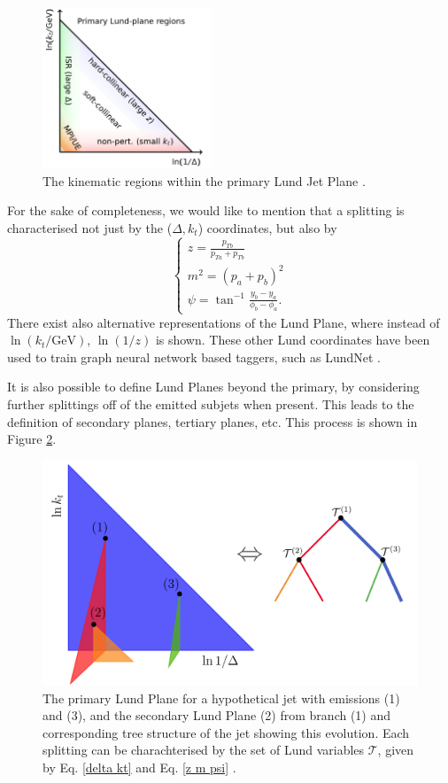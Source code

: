 \documentclass[10pt,a4paper]{book}
\begin{document}
\begin{figure}[]
\centering
\includegraphics[width=0.45\textwidth]{lund_plane}
\caption{The kinematic regions within the primary Lund Jet Plane \cite{Dreyer:2018nbf}.}
\label{LundPlane}
\end{figure}

For the sake of completeness, we would like to mention that a splitting is characterised not just by the ($\Delta, k_t$) coordinates, but also by
\begin{equation}
\begin{cases}
 z = \frac{p_{Tb}}{p_{Ta}+p_{Tb}} \\
 m^2 = (p_a + p_b)^2 \\
 \psi = \tan^{-1} \frac{y_b - y_a}{\phi_b - \phi_a}.
\end{cases}
\label{z m psi}
\end{equation}
There exist also alternative representations of the Lund Plane, where instead of $\ln(k_t/\mathrm{GeV})$, $\ln(1/z)$ is shown. These other Lund coordinates have been used to train graph neural network based taggers, such as LundNet \cite{Dreyer:2020brq}. 

It is also possible to define Lund Planes beyond the primary, by considering further splittings off of the emitted subjets when present. This leads to the definition of secondary planes, tertiary planes, etc. This process is shown in Figure \ref{emissions}.

\begin{figure}
\centering
\includegraphics[width=0.7\linewidth]{emissions}
\caption{The primary Lund Plane for a hypothetical jet with emissions (1) and (3), and the secondary Lund Plane (2) from branch (1) and corresponding tree structure of the jet showing this evolution. Each splitting can be charachterised by the set of Lund variables $\mathcal{T}$, given by Eq. \ref{delta kt} and Eq. \ref{z m psi} \cite{Dreyer:2020brq}.}
\label{emissions}
\end{figure}
\end{document}
